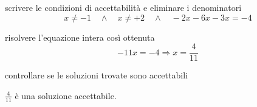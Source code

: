 \begin{exrig}
\begin{esempio}
\begin{enumerate*}
\item scrivere le condizioni di accettabilità e eliminare i denominatori
\[x \neq -1 \quad \wedge \quad x \neq +2 \quad \wedge \quad 
-2x -6x -3x = -4\]
\item risolvere l'equazione intera così ottenuta
\[-11x = -4 \Rightarrow x=\frac{4}{11}\]
\item controllare se le soluzioni trovate sono accettabili

\centering $\frac{4}{11}$ è una soluzione accettabile.

\end{enumerate*}
 \end{esempio}

% 

\end{exrig}

